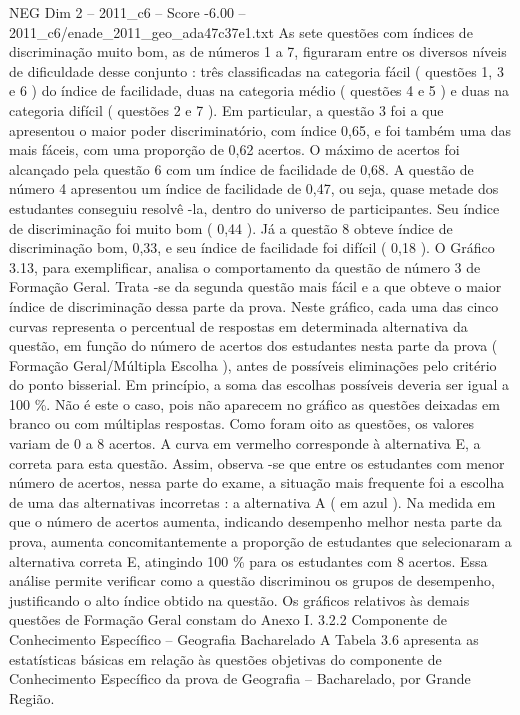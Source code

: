 \begin{textsample}{NEG Dim 2 – 2011\_c6 – Score -6.00 – 2011\_c6/enade\_2011\_geo\_ada47c37e1.txt}
As sete questões com índices de discriminação muito bom, as de números 1 a 7, figuraram entre os diversos níveis de dificuldade desse conjunto : três classificadas na categoria fácil ( questões 1, 3 e 6 ) do índice de facilidade, duas na categoria médio ( questões 4 e 5 ) e duas na categoria difícil ( questões 2 e 7 ).
Em particular, a questão 3 foi a que apresentou o maior poder discriminatório, com índice 0,65, e foi também uma das mais fáceis, com uma proporção de 0,62 acertos.
O máximo de acertos foi alcançado pela questão 6 com um índice de facilidade de 0,68.
A questão de número 4 apresentou um índice de facilidade de 0,47, ou seja, quase metade dos estudantes conseguiu resolvê -la, dentro do universo de participantes.
Seu índice de discriminação foi muito bom ( 0,44 ).
Já a questão 8 obteve índice de discriminação bom, 0,33, e seu índice de facilidade foi difícil ( 0,18 ).
O Gráfico 3.13, para exemplificar, analisa o comportamento da questão de número 3 de Formação Geral.
Trata -se da segunda questão mais fácil e a que obteve o maior índice de discriminação dessa parte da prova.
Neste gráfico, cada uma das cinco curvas representa o percentual de respostas em determinada alternativa da questão, em função do número de acertos dos estudantes nesta parte da prova ( Formação Geral/Múltipla Escolha ), antes de possíveis eliminações pelo critério do ponto bisserial.
Em princípio, a soma das escolhas possíveis deveria ser igual a 100 \%.
Não é este o caso, pois não aparecem no gráfico as questões deixadas em branco ou com múltiplas respostas.
Como foram oito as questões, os valores variam de 0 a 8 acertos.
A curva em vermelho corresponde à alternativa E, a correta para esta questão.
Assim, observa -se que entre os estudantes com menor número de acertos, nessa parte do exame, a situação mais frequente foi a escolha de uma das alternativas incorretas : a alternativa A ( em azul ).
Na medida em que o número de acertos aumenta, indicando desempenho melhor nesta parte da prova, aumenta concomitantemente a proporção de estudantes que selecionaram a alternativa correta E, atingindo 100 \% para os estudantes com 8 acertos.
Essa análise permite verificar como a questão discriminou os grupos de desempenho, justificando o alto índice obtido na questão.
Os gráficos relativos às demais questões de Formação Geral constam do Anexo I. 3.2.2 Componente de Conhecimento Específico – Geografia Bacharelado A Tabela 3.6 apresenta as estatísticas básicas em relação às questões objetivas do componente de Conhecimento Específico da prova de Geografia – Bacharelado, por Grande Região.

\end{textsample}

